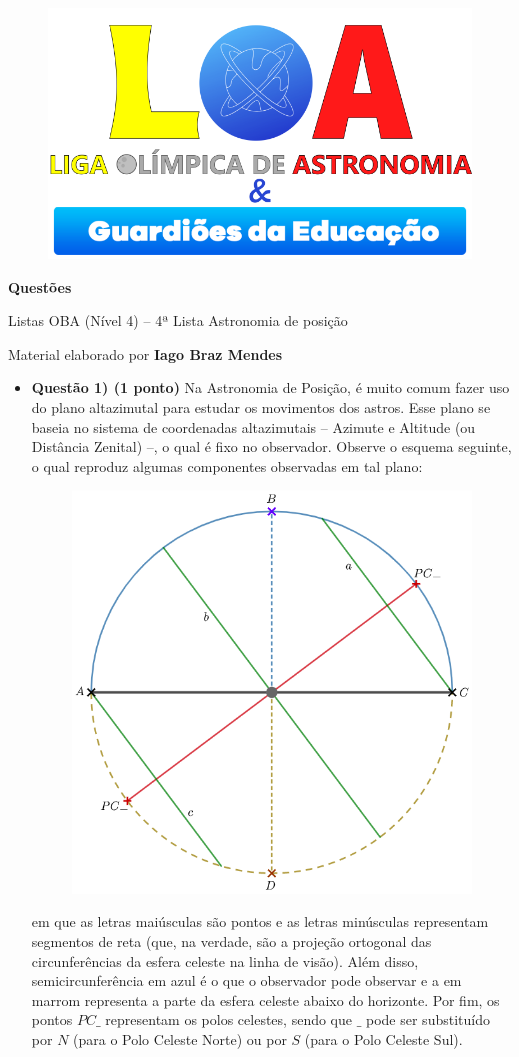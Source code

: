 \documentclass[a4paper, 12pt]{article}
\newcommand{\cabecalho}[4]
{
	\begin{figure}
		\centering
		\href{https://ligaolimpicadeastronomia.com.br/}{\includegraphics[scale=0.6]{./img/logos.png}}
	\end{figure}
	
	\begin{center}
		\begin{large}
			\textbf{#1}	
		\end{large}
			\linebreak Listas OBA (Nível 4) -- #2ª Lista
			\linebreak #3
		\end{center}
	
	\begin{flushright}
		Material elaborado por \textbf{#4}
	\end{flushright}
}
\begin{document}
	\cabecalho{Questões}{4}{Astronomia de posição}{Iago Braz Mendes}
	
	\begin{flushleft}
	\begin{itemize}
		\item \textbf{Questão 1) (1 ponto)} Na Astronomia de Posição, é muito comum fazer uso do plano altazimutal para estudar os movimentos dos astros. Esse plano se baseia no sistema de coordenadas altazimutais -- Azimute e Altitude (ou Distância Zenital) --, o qual é fixo no observador. Observe o esquema seguinte, o qual reproduz algumas componentes observadas em tal plano:
			\begin{figure}[H]
				\centering
				\includegraphics[scale=0.5]{./img/1.png}
			\end{figure}
			em que as letras maiúsculas são pontos e as letras minúsculas representam segmentos de reta (que, na verdade, são a projeção ortogonal das circunferências da esfera celeste na linha de visão). Além disso, semicircunferência em azul é o que o observador pode observar e a em marrom representa a parte da esfera celeste abaixo do horizonte. Por fim, os pontos $PC\_$ representam os polos celestes, sendo que $\_$ pode ser substituído por $N$ (para o Polo Celeste Norte) ou por $S$ (para o Polo Celeste Sul).
			\begin{itemize}

\end{itemize}
\end{itemize}
\end{flushleft}
\end{document}
